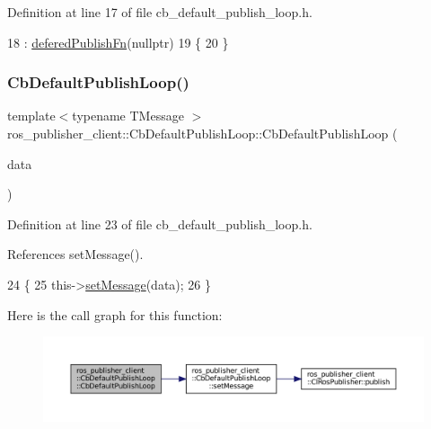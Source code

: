 Definition at line 17 of file cb\+\_\+default\+\_\+publish\+\_\+loop.\+h.


\begin{DoxyCode}
18         : \hyperlink{classros__publisher__client_1_1CbDefaultPublishLoop_a321f79f015449668a184cd30b6c2ad51}{deferedPublishFn}(\textcolor{keyword}{nullptr})
19     \{
20     \}
\end{DoxyCode}
\mbox{\label{classros__publisher__client_1_1CbDefaultPublishLoop_ac7b6e38399dae0fb03f81f23b7de5124}} 
\subsubsection{\texorpdfstring{Cb\+Default\+Publish\+Loop()}{CbDefaultPublishLoop()}\hspace{0.1cm}{\footnotesize\ttfamily [2/2]}}
{\footnotesize\ttfamily template$<$typename T\+Message $>$ \\
ros\+\_\+publisher\+\_\+client\+::\+Cb\+Default\+Publish\+Loop\+::\+Cb\+Default\+Publish\+Loop (\begin{DoxyParamCaption}\item[{const T\+Message \&}]{data }\end{DoxyParamCaption})\hspace{0.3cm}{\ttfamily [inline]}}



Definition at line 23 of file cb\+\_\+default\+\_\+publish\+\_\+loop.\+h.



References set\+Message().


\begin{DoxyCode}
24     \{
25         this->\hyperlink{classros__publisher__client_1_1CbDefaultPublishLoop_a8bba9039f6a6841c21e9bc89c2fd8ab7}{setMessage}(data);
26     \}
\end{DoxyCode}
Here is the call graph for this function\+:
\nopagebreak
\begin{figure}[H]
\begin{center}
\leavevmode
\includegraphics[width=350pt]{classros__publisher__client_1_1CbDefaultPublishLoop_ac7b6e38399dae0fb03f81f23b7de5124_cgraph}
\end{center}
\end{figure}


